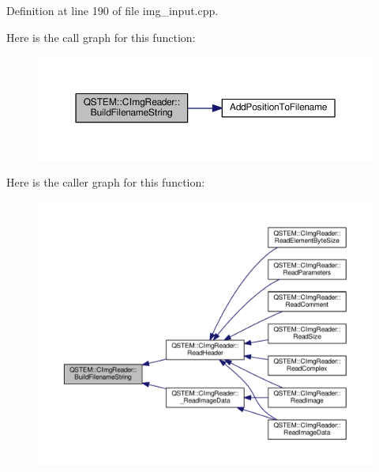 Definition at line 190 of file img\-\_\-input.\-cpp.



Here is the call graph for this function\-:
\nopagebreak
\begin{figure}[H]
\begin{center}
\leavevmode
\includegraphics[width=350pt]{class_q_s_t_e_m_1_1_c_img_reader_a7cace40ef620bdc3c016d7368c688a02_cgraph}
\end{center}
\end{figure}




Here is the caller graph for this function\-:
\nopagebreak
\begin{figure}[H]
\begin{center}
\leavevmode
\includegraphics[width=350pt]{class_q_s_t_e_m_1_1_c_img_reader_a7cace40ef620bdc3c016d7368c688a02_icgraph}
\end{center}
\end{figure}


